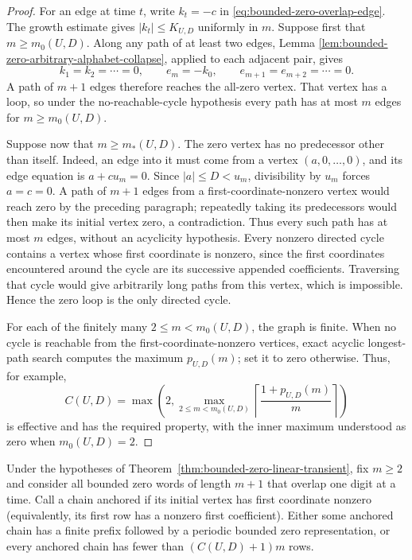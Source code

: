\begin{proof}
For an edge at time $t$, write $k_t=-c$ in
\eqref{eq:bounded-zero-overlap-edge}.  The growth estimate gives
$|k_t|\le K_{U,D}$ uniformly in $m$.  Suppose first that
$m\ge m_0(U,D)$.  Along any path of at least two edges, Lemma
\ref{lem:bounded-zero-arbitrary-alphabet-collapse}, applied to each adjacent
pair, gives
\[
k_1=k_2=\cdots=0,\qquad
e_m=-k_0,\qquad e_{m+1}=e_{m+2}=\cdots=0.
\]
A path of $m+1$ edges therefore reaches the all-zero vertex.  That vertex
has a loop, so under the no-reachable-cycle hypothesis every path has at
most $m$ edges for $m\ge m_0(U,D)$.

Suppose now that $m\ge m_*(U,D)$.  The zero vertex has no predecessor other
than itself.  Indeed, an edge into it must come from a vertex
$(a,0,\ldots,0)$, and its edge equation is $a+cu_m=0$.  Since
$|a|\le D<u_m$, divisibility by $u_m$ forces $a=c=0$.  A path of $m+1$
edges from a first-coordinate-nonzero vertex would reach zero by the
preceding paragraph; repeatedly taking its predecessors would then make its
initial vertex zero, a contradiction.  Thus every such path has at most
$m$ edges, without an acyclicity hypothesis.  Every nonzero directed cycle
contains a vertex whose first coordinate is nonzero, since the first
coordinates encountered around the cycle are its successive appended
coefficients.  Traversing that cycle would give arbitrarily long paths from
this vertex, which is impossible.  Hence the zero loop is the only directed
cycle.

For each of the finitely many $2\le m<m_0(U,D)$, the graph is finite.  When
no cycle is reachable from the first-coordinate-nonzero vertices, exact
acyclic longest-path search computes the maximum $p_{U,D}(m)$; set it to
zero otherwise.  Thus, for example,
\[
C(U,D)=\max\left(2,
 \max_{2\le m<m_0(U,D)}
 \left\lceil\frac{1+p_{U,D}(m)}m\right\rceil\right)
\]
is effective and has the required property, with the inner maximum understood
as zero when $m_0(U,D)=2$.
\end{proof}

\begin{corollary}
\label{cor:bounded-zero-global-dichotomy}
Under the hypotheses of Theorem~\ref{thm:bounded-zero-linear-transient}, fix
$m\ge2$ and consider all bounded zero words of length $m+1$ that overlap one
digit at a time.  Call a chain anchored if its initial vertex has first
coordinate nonzero (equivalently, its first row has a nonzero first
coefficient).  Either some anchored chain has a finite prefix followed by a
periodic bounded zero representation, or every anchored chain has fewer than
$(C(U,D)+1)m$ rows.
\end{corollary}

